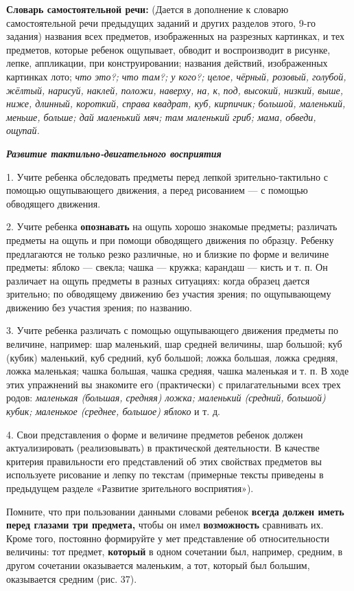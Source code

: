 \documentclass[a5paper]{book}
\renewcommand{\emph}[1]{\textit{#1}}
\begin{document}
\textbf{Словарь самостоятельной речи:} (Дается в дополнение к словарю
самостоятельной речи предыдущих заданий и других разделов этого, 9-го
задания) названия всех предметов, изображенных на разрезных картинках, и
тех предметов, которые ребенок ощупывает, обводит и воспроизводит в
рисунке, лепке, аппликации\textsc{,} при конструировании; названия
действий, изображенных картинках лото; \emph{что это?; что там?; у
кого?; целое, чёрный, розовый, голубой, жёлтый, нарисуй, наклей, положи,
наверху, на, к}, \emph{под, высокий, низкий, выше, ниже, длинный,
короткий, справа квадрат, куб, кирпичик; большой, маленький, меньше,
больше; дай маленький мяч; там маленький гриб; мама, обведи, ощупай.}

\emph{\textbf{Развитие тактильно-двигательного восприятия}}

1. Учите ребенка обследовать предметы перед лепкой зрительно-тактильно с
помощью ощупывающего движения, а перед рисованием --- с помощью
обводящего движения.

2. Учите ребенка \textbf{опознавать} на ощупь хорошо знакомые предметы;
различать предметы на ощупь и при помощи обводящего движения по образцу.
Ребенку предлагаются не только резко различные, но и близкие по форме и
величине предметы: яблоко --- свекла; чашка --- кружка; карандаш ---
кисть и т. п. Он различает на ощупь предметы в разных ситуациях: когда
образец дается зрительно; по обводящему движению без участия зрения; по
ощупывающему движению без участия зрения; по названию.

3. Учите ребенка различать с помощью ощупывающего движения предметы по
величине, например: шар маленький, шар средней величины, шар большой;
куб (кубик) маленький, куб средний, куб большой; ложка большая, ложка
средняя, ложка маленькая; чашка большая, чашка средняя, чашка маленькая
и т. п. В ходе этих упражнений вы знакомите его (практически) с
прилагательными всех трех родов: \emph{маленькая (большая, средняя)
ложка; маленький (средний, большой) кубик; маленькое (среднее, большое)
яблоко} и т. д.

4. Свои представления о форме и величине предметов ребенок должен
актуализировать (реализовывать) в практической деятельности. В качестве
критерия правильности его представлений об этих свойствах предметов вы
используете рисование и лепку по текстам (примерные тексты приведены в
предыдущем разделе «Развитие зрительного восприятия»).

Помните, что при пользовании данными словами ребенок \textbf{всегда
должен иметь перед глазами три предмета,} чтобы он имел
\textbf{возможность} сравнивать их. Кроме того, постоянно формируйте у
мет представление об относительности величины: тот предмет,
\textbf{который} в одном сочетании был, например, средним, в другом
сочетании оказывается маленьким, а тот, который был большим, оказывается
средним (рис. 37).
\end{document}

